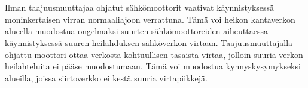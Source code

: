 \documentclass[finnish,12pt,a4paper,pdftex,elec,utf8]{aaltothesis}
\begin{document}
\\\\
Ilman taajuusmuuttajaa ohjatut sähkömoottorit vaativat käynnistyksessä moninkertaisen virran normaaliajoon verrattuna. Tämä voi heikon kantaverkon alueella muodostua ongelmaksi suurten sähkömoottoreiden aiheuttaessa käynnistyksessä suuren heilahduksen sähköverkon virtaan. Taajuusmuuttajalla ohjattu moottori ottaa verkosta kohtuullisen tasaista virtaa, jolloin suuria verkon heilahteluita ei pääse muodostumaan. Tämä voi muodostua kynnyskysymykseksi alueilla, joissa siirtoverkko ei kestä suuria virtapiikkejä. \cite{MyyntiHaastattelu}

\end{document}
